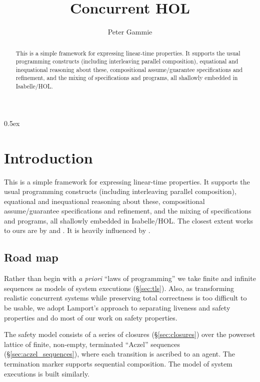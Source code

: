 \documentclass[11pt,a4paper]{article}
\begin{document}
\title{Concurrent HOL}
\author{Peter Gammie}
\maketitle

\begin{abstract}
  This is a simple framework for expressing linear-time properties. It
  supports the usual programming constructs (including interleaving
  parallel composition), equational and inequational reasoning about
  these, compositional assume/guarantee specifications and refinement,
  and the mixing of specifications and programs, all shallowly
  embedded in Isabelle/HOL.
\end{abstract}

\tableofcontents

\parindent 0pt\parskip 0.5ex

\section{Introduction}

This is a simple framework for expressing linear-time properties. It
supports the usual programming constructs (including interleaving
parallel composition), equational and inequational reasoning about
these, compositional assume/guarantee specifications and refinement,
and the mixing of specifications and programs, all shallowly embedded
in Isabelle/HOL. The closest extent works to ours are by
\citet{XuHe:1991,XuHe:1994} and
\citet{Dingel:1996,Dingel:2000,Dingel:2002}. It is heavily influenced
by \citet{Lamport:1994}.


\subsection{Road map \label{sec:road_map}}

Rather than begin with \emph{a priori} ``laws of programming'' we take
finite and infinite sequences as models of system executions
(\S\ref{sec:tls}). Also, as transforming realistic concurrent systems
while preserving total correctness is too difficult to be usable, we
adopt Lamport's approach to separating liveness and safety properties
\citep{AbadiLamport:1991} and do most of our work on safety
properties.

The safety model consists of a series of closures
(\S\ref{sec:closures}) over the powerset lattice of finite, non-empty,
terminated ``Aczel'' sequences (\S\ref{sec:aczel_sequences}), where
each transition is ascribed to an agent. The termination marker
supports sequential composition. The model of system executions is
built similarly.
\end{document}
